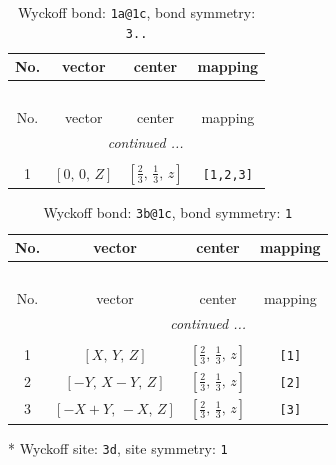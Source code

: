 \documentclass[fleqn,8pt]{jsarticle}
\begin{document}
\begin{longtable}{cccc}
\caption{Wyckoff bond: {\tt 1a@1c}, bond symmetry: {\tt 3..}}
 \\
 \hline \hline
No. & vector & center & mapping \\ \hline \endfirsthead

\multicolumn{3}{l}{\tablename\ \thetable{}} \\
 \hline \hline
No. & vector & center & mapping \\ \hline \endhead

 \hline \hline
\multicolumn{3}{r}{\footnotesize\it continued ...} \\ \endfoot

 \hline \hline
\multicolumn{3}{r}{} \\ \endlastfoot

1 & $\left[ 0,\, 0,\, Z \right]$ & $\left[ \frac{2}{3},\, \frac{1}{3},\, z \right]$ & {\tt [1,2,3]} \\
\end{longtable}
\renewcommand{\arraystretch}{1.2}
\begin{longtable}{cccc}
\caption{Wyckoff bond: {\tt 3b@1c}, bond symmetry: {\tt 1}}
 \\
 \hline \hline
No. & vector & center & mapping \\ \hline \endfirsthead

\multicolumn{3}{l}{\tablename\ \thetable{}} \\
 \hline \hline
No. & vector & center & mapping \\ \hline \endhead

 \hline \hline
\multicolumn{3}{r}{\footnotesize\it continued ...} \\ \endfoot

 \hline \hline
\multicolumn{3}{r}{} \\ \endlastfoot

1 & $\left[ X,\, Y,\, Z \right]$ & $\left[ \frac{2}{3},\, \frac{1}{3},\, z \right]$ & {\tt [1]} \\ \hline
2 & $\left[ - Y,\, X - Y,\, Z \right]$ & $\left[ \frac{2}{3},\, \frac{1}{3},\, z \right]$ & {\tt [2]} \\ \hline
3 & $\left[ - X + Y,\, - X,\, Z \right]$ & $\left[ \frac{2}{3},\, \frac{1}{3},\, z \right]$ & {\tt [3]} \\
\end{longtable}
* Wyckoff site: {\tt 3d}, site symmetry: {\tt 1}
\renewcommand{\arraystretch}{1.2}
\end{document}
